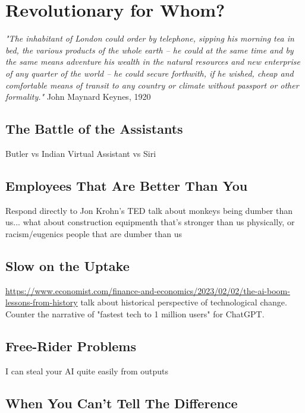 \setchapterpreamble[u]{\margintoc}
\chapter{Revolutionary for Whom?}

\textit{"The inhabitant of London could order by telephone, sipping his morning tea in bed, the various products of the whole earth -- he could at the same time and by the same means adventure his wealth in the natural resources and new enterprise of any quarter of the world -- he could secure forthwith, if he wished, cheap and comfortable means of transit to any country or climate without passport or other formality."} John Maynard Keynes, 1920 \cite{Keynes2012}

\section{The Battle of the Assistants}

Butler vs Indian Virtual Assistant vs Siri

\section{Employees That Are Better Than You}

Respond directly to Jon Krohn's TED talk about monkeys being dumber than us... what about construction equipmenth that's stronger than us physically, or racism/eugenics people that are dumber than us 

\section{Slow on the Uptake}

\url{https://www.economist.com/finance-and-economics/2023/02/02/the-ai-boom-lessons-from-history} talk about historical perspective of technological change. Counter the narrative of "fastest tech to 1 million users" for ChatGPT.

\section{Free-Rider Problems}

I can steal your AI quite easily from outputs

\section{When You Can't Tell The Difference}

